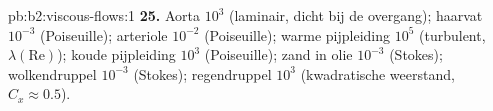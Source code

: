 \begin{solution}{pb:b2:viscous-flows:1}
\textbf{25.} Aorta $10^3$ (laminair, dicht bij de overgang); haarvat
$10^{-3}$ (Poiseuille); arteriole $10^{-2}$ (Poiseuille); warme pijpleiding
$10^5$ (turbulent, $\lambda(\mathrm{Re})$); koude pijpleiding $10^3$
(Poiseuille); zand in olie $10^{-3}$ (Stokes); wolkendruppel $10^{-3}$
(Stokes); regendruppel $10^3$ (kwadratische weerstand, $C_x \approx 0.5$).
\end{solution}
